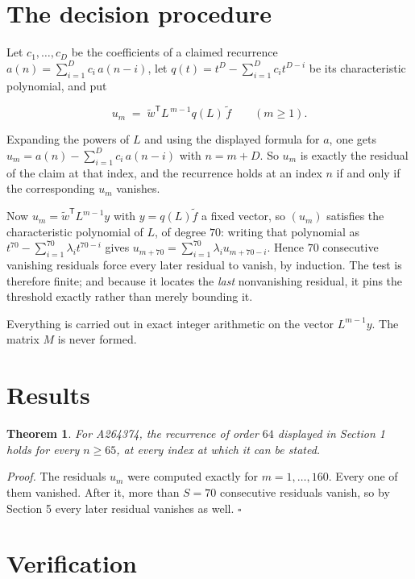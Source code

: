 \documentclass[11pt]{article}
\newtheorem{theorem}{Theorem}
\theoremstyle{definition}
\begin{document}
\section{The decision procedure}

Let $c_1,\dots,c_D$ be the coefficients of a claimed recurrence $a(n) = \sum_{i=1}^{D} c_i\,a(n-i)$, let $q(t) = t^{D} - \sum_{i=1}^{D} c_i t^{D-i}$ be its characteristic polynomial, and put

\[u_m \;=\; \tilde w^{\mathsf T} L^{\,m-1} q(L)\,\tilde f \qquad (m \ge 1).\]

Expanding the powers of $L$ and using the displayed formula for $a$, one gets $u_m = a(n) - \sum_{i=1}^{D} c_i\,a(n-i)$ with $n = m + D$. So $u_m$ is exactly the residual of the claim at that index, and the recurrence holds at an index $n$ if and only if the corresponding $u_m$ vanishes.

Now $u_m = \tilde w^{\mathsf T} L^{m-1} y$ with $y = q(L)\tilde f$ a fixed vector, so $(u_m)$ satisfies the characteristic polynomial of $L$, of degree $70$: writing that polynomial as $t^{70} - \sum_{i=1}^{70} \lambda_i t^{70-i}$ gives $u_{m+70} = \sum_{i=1}^{70} \lambda_i u_{m+70-i}$. Hence $70$ consecutive vanishing residuals force every later residual to vanish, by induction. The test is therefore finite; and because it locates the {\itshape last} nonvanishing residual, it pins the threshold exactly rather than merely bounding it.

Everything is carried out in exact integer arithmetic on the vector $L^{m-1}y$. The matrix $M$ is never formed.

\section{Results}

\begin{theorem} For A264374, the recurrence of order $64$ displayed in Section 1 holds for every $n \ge 65$, at every index at which it can be stated.\end{theorem}

{\itshape Proof.} The residuals $u_m$ were computed exactly for $m = 1,\dots,160$. Every one of them vanished. After it, more than $S = 70$ consecutive residuals vanish, so by Section 5 every later residual vanishes as well. $\square$

\section{Verification}
\end{document}
